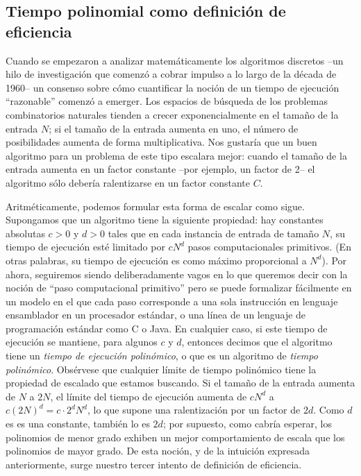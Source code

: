 \documentclass[a4paper, 12pt]{book}
\theoremstyle{dotless}
\begin{document}
\subsection*{Tiempo polinomial como definición de eficiencia} 

Cuando se empezaron a analizar matemáticamente los algoritmos discretos --un hilo de investigación que comenzó a cobrar impulso a lo largo de la década de 1960-- un consenso sobre cómo cuantificar la noción de un tiempo de ejecución ``razonable'' comenzó a emerger. Los espacios de búsqueda de los problemas combinatorios naturales tienden a crecer exponencialmente en el tamaño de la entrada $N$; si el tamaño de la entrada aumenta en uno, el número de posibilidades aumenta de forma multiplicativa. Nos gustaría que un buen algoritmo para un problema de este tipo escalara mejor: cuando el tamaño de la entrada aumenta en un factor constante --por ejemplo, un factor de 2-- el algoritmo sólo debería ralentizarse en un factor constante $C$.

Aritméticamente, podemos formular esta forma de escalar como sigue. Supongamos que un algoritmo tiene la siguiente propiedad: hay constantes absolutas $c>0$ y $d>0$ tales que en cada instancia de entrada de tamaño $N$, su tiempo de ejecución esté limitado por $cN^d$ pasos computacionales primitivos. (En otras palabras, su tiempo de ejecución es como máximo proporcional a $N^d$). Por ahora, seguiremos siendo deliberadamente vagos en lo que queremos decir con la noción de ``paso computacional primitivo'' pero se puede formalizar fácilmente en un modelo en el que cada paso corresponde a una sola instrucción en lenguaje ensamblador en un procesador estándar, o una línea de un lenguaje de programación estándar como C o Java. 
En cualquier caso, si este tiempo de ejecución se mantiene, para algunos $c$ y $d$, entonces decimos que el algoritmo tiene un \textit{tiempo de ejecución polinómico}, o que es un algoritmo de \textit{tiempo polinómico}. Obsérvese que cualquier límite de tiempo polinómico tiene la propiedad de escalado que estamos buscando. Si el tamaño de la entrada aumenta de $N$ a $2N$, el límite del tiempo de ejecución aumenta de $cN^d$ a $c(2N)^d = c\cdot 2^dN^d$, lo que supone una ralentización por un factor de $2d$. Como $d$ es es una constante, también lo es $2d$; por supuesto, como cabría esperar, los polinomios de menor grado exhiben un mejor comportamiento de escala que los polinomios de mayor grado.
De esta noción, y de la intuición expresada anteriormente, surge nuestro tercer intento de definición de eficiencia.
\end{document}
